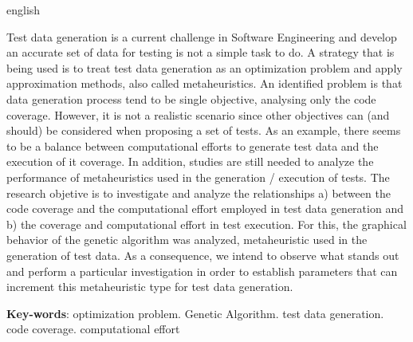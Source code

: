 \begin{resumo}[Abstract]
 \begin{otherlanguage*}{english}
   
Test data generation is a current challenge in Software Engineering and develop an accurate set of data for testing is not a simple task to do. A strategy that is being used is to treat test data generation as an optimization problem and apply approximation methods, also called metaheuristics. An identified problem is that data generation process tend to be single objective, analysing only the code coverage. However, it is not a realistic scenario since other objectives can (and should) be considered when proposing a set of tests. As an example, there seems to be a balance between computational efforts to generate test data and the execution of it coverage. In addition, studies are still needed to analyze the performance of metaheuristics used in the generation / execution of tests. The research objetive is to investigate and analyze the relationships a) between the code coverage and the computational effort employed in test data generation and b) the coverage and computational effort in test execution. For this, the graphical behavior of the genetic algorithm was analyzed, metaheuristic used in the generation of test data. As a consequence, we intend to observe what stands out and perform a particular investigation in order to establish parameters that can increment this metaheuristic type for test data generation.

   \vspace{\onelineskip}
 
   \noindent 
   \textbf{Key-words}: optimization problem. Genetic Algorithm. test data generation. code coverage. computational effort
 \end{otherlanguage*}
\end{resumo}